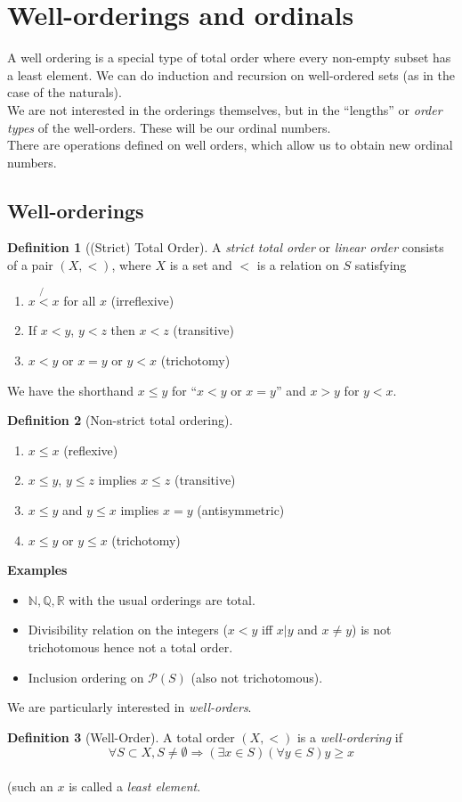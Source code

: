 \documentclass{article}
\theoremstyle{definition}
\newtheorem{definition}{Definition}
\numberwithin{definition}{section}
\begin{document}
\section{Well-orderings and ordinals}
A well ordering is a special type of total order where every non-empty subset has a least element. We can do induction and recursion on well-ordered sets (as in the case of the naturals). \\
We are not interested in the orderings themselves, but in the ``lengths'' or \textit{order types} of the well-orders. These will be our ordinal numbers. \\
There are operations defined on well orders, which allow us to obtain new ordinal numbers. \\
\subsection{Well-orderings}
\begin{definition}[(Strict) Total Order]
A \textit{strict total order} or \textit{linear order} consists of a pair $(X,<)$, where $X$ is a set and $<$ is a relation on $S$ satisfying
\begin{enumerate}[i]
\item $ x \not{<} x$ for all $x$ (irreflexive)
\item If $x<y$, $y<z$ then $x<z$ (transitive)
\item $x<y$ or $x=y$ or $y<x$ (trichotomy)
\end{enumerate}
\end{definition}
We have the shorthand $x \le y$ for ``$x<y$ or $x=y$'' and $x>y$ for $y<x$. \\
\begin{definition}[Non-strict total ordering]
\begin{enumerate}[i]
\item $x \le x$ (reflexive) 
\item $x \le y$, $y \le z$ implies $x \le z$ (transitive) 
\item $x \le y$ and $y \le x$ implies $x=y$ (antisymmetric)
\item $x \le y$ or $y \le x$ (trichotomy)
\end{enumerate}
\end{definition}

\textbf{Examples}
\begin{itemize}
\item $\mathbb{N}, \mathbb{Q}, \mathbb{R}$ with the usual orderings are total.
\item Divisibility relation on the integers ($x < y$ iff $x|y$ and $x \ne y$) is not trichotomous hence not a total order. 
\item Inclusion ordering on $\mathcal{P}(S)$ (also not trichotomous).
\end{itemize}
We are particularly interested in \textit{well-orders}. 
\begin{definition}[Well-Order]
A total order $(X,<)$ is a \textit{well-ordering} if 
$$\forall S \subset X, S \ne \emptyset \Rightarrow (\exists x \in S) (\forall y \in S) y \ge x$$\\
(such an $x$ is called a \textit{least element}. 
\end{definition}
\end{document}
